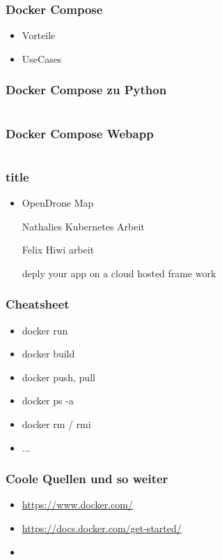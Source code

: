 \documentclass[22pt,handout]{beamer}
\begin{document}
\begin{frame}[t]
    \frametitle{Docker Compose}
    \begin{itemize}
        \item Vorteile
        \item UseCases
    \end{itemize} 
\end{frame}

\begin{frame}[fragile]
    \frametitle{Docker Compose zu Python}
    \inputminted[fontsize=\footnotesize, frame=lines]{dockerfile}{../examples/Dockerfile.cmd}
\end{frame}

\begin{frame}[fragile]
    \frametitle{Docker Compose Webapp}
    \inputminted[fontsize=\footnotesize, frame=lines]{dockerfile}{../examples/Dockerfile.cmd}
\end{frame}

\begin{frame}[t]
    \frametitle{title}
    \begin{itemize}
        \item OpenDrone Map
        \item [Nathalies Kubernetes Arbeit]
        \item [Felix Hiwi arbeit]
        \item [deply your app on a cloud hosted frame work]
    \end{itemize}
\end{frame}

\begin{frame}[t]
    \frametitle{Cheatsheet}
    \begin{itemize}
        \item docker run
        \item docker build
        \item docker push, pull
        \item docker ps -a
        \item docker rm / rmi
        \item ...
    \end{itemize} 
\end{frame}

\begin{frame}[t]
    \frametitle{Coole Quellen und so weiter}
    \begin{itemize}
        \item \href{https://www.docker.com/}{https://www.docker.com/}
        \item \href{https://docs.docker.com/get-started/}{https://docs.docker.com/get-started/}
        \item 
    \end{itemize} 
\end{frame}
\end{document}
